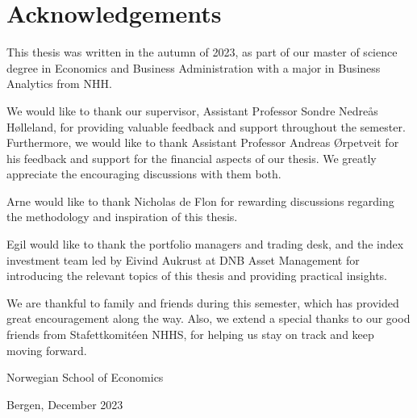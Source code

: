 
\section*{Acknowledgements}


This thesis was written in the autumn of 2023, as part of our master of science degree in Economics and Business Administration with a major in Business Analytics from NHH. 

We would like to thank our supervisor, Assistant Professor Sondre Nedreås Hølleland, for providing valuable feedback and support throughout the semester. Furthermore, we would like to thank Assistant Professor Andreas Ørpetveit for his feedback and support for the financial aspects of our thesis. We greatly appreciate the encouraging discussions with them both. 

Arne would like to thank Nicholas de Flon for rewarding discussions regarding the methodology and inspiration of this thesis. 

Egil would like to thank the portfolio managers and trading desk, and the index investment team led by Eivind Aukrust at DNB Asset Management for introducing the relevant topics of this thesis and providing practical insights. 

We are thankful to family and friends during this semester, which has provided great encouragement along the way. Also, we extend a special thanks to our good friends from Stafettkomitéen NHHS, for helping us stay on track and keep moving forward. 

\vspace{1in} %

\begin{center}
    Norwegian School of Economics 
\end{center}
\begin{center}
    Bergen, December 2023 
\end{center}

\vspace{1in} %
\noindent
\makebox[2.5in]{\hrulefill} \hfill \makebox[2.5in]{\hrulefill} \\
 \hfill {}

